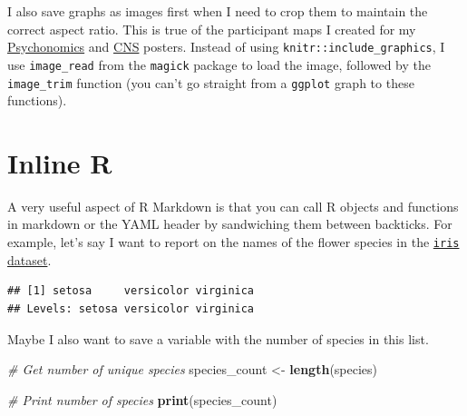 \documentclass[
  openany]{book}
\newenvironment{Shaded}{\begin{snugshade}}{\end{snugshade}}
\newcommand{\CommentTok}[1]{\textcolor[rgb]{0.56,0.35,0.01}{\textit{#1}}}
\newcommand{\KeywordTok}[1]{\textcolor[rgb]{0.13,0.29,0.53}{\textbf{#1}}}
\newcommand{\NormalTok}[1]{#1}
\newcommand{\OperatorTok}[1]{\textcolor[rgb]{0.81,0.36,0.00}{\textbf{#1}}}
\newcommand{\StringTok}[1]{\textcolor[rgb]{0.31,0.60,0.02}{#1}}
\begin{document}
I also save graphs as images first when I need to crop them to maintain the correct aspect ratio. This is true of the participant maps I created for my \href{https://github.com/hollzzar/psychonomics-poster/blob/master/Psychonomics.pdf}{Psychonomics} and \href{https://github.com/hollzzar/CNS-2020-poster/blob/master/CNS_2020.pdf}{CNS} posters. Instead of using \texttt{knitr::include\_graphics}, I use \texttt{image\_read} from the \texttt{magick} package to load the image, followed by the \texttt{image\_trim} function (you can't go straight from a \texttt{ggplot} graph to these functions).

\hypertarget{rintext}{%
\section{Inline R}\label{rintext}}

A very useful aspect of R Markdown is that you can call R objects and functions in markdown or the YAML header by sandwiching them between backticks. For example, let's say I want to report on the names of the flower species in the \href{https://archive.ics.uci.edu/ml/datasets/iris}{\texttt{iris} dataset}.

\begin{Shaded}
\end{Shaded}

\begin{verbatim}
## [1] setosa     versicolor virginica 
## Levels: setosa versicolor virginica
\end{verbatim}

Maybe I also want to save a variable with the number of species in this list.

\begin{Shaded}
\begin{Highlighting}[]
\CommentTok{# Get number of unique species}
\NormalTok{species_count <-}\StringTok{ }\KeywordTok{length}\NormalTok{(species)}

\CommentTok{# Print number of species}
\KeywordTok{print}\NormalTok{(species_count)}
\end{Highlighting}
\end{Shaded}
\end{document}
